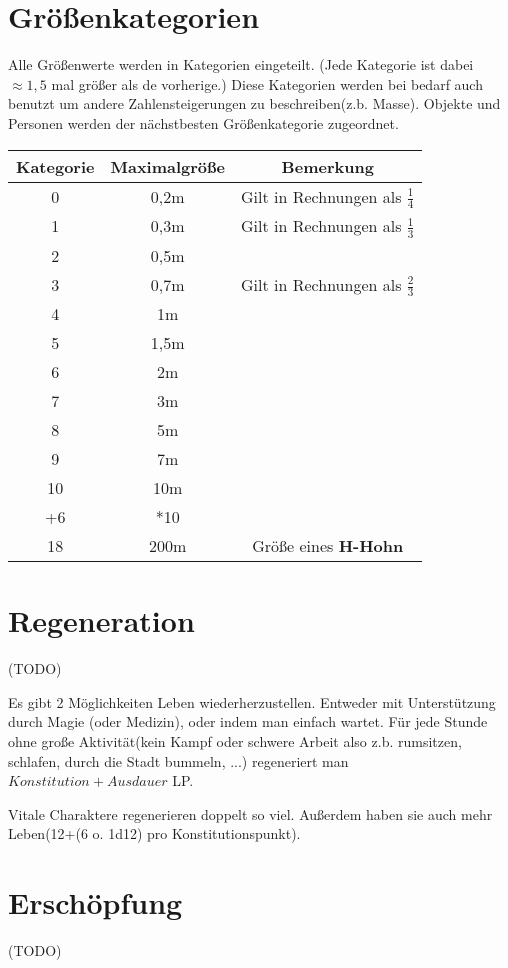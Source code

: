 \section{Größenkategorien}
Alle Größenwerte werden in Kategorien eingeteilt. (Jede Kategorie ist dabei $\approx1,5$ mal größer als de vorherige.) Diese Kategorien werden bei bedarf auch benutzt um andere Zahlensteigerungen zu beschreiben(z.b. Masse). Objekte und Personen werden der nächstbesten Größenkategorie zugeordnet.
\begin{tabular}{|c|c|c|}
\hline 
Kategorie & Maximalgröße & Bemerkung \\ 
\hline 
0 & 0,2m & Gilt in Rechnungen als $\frac{1}{4}$ \\ 
\hline 
1 & 0,3m & Gilt in Rechnungen als $\frac{1}{3}$\\ 
\hline 
2 & 0,5m &\\ 
\hline 
3 & 0,7m & Gilt in Rechnungen als $\frac{2}{3}$\\ 
\hline 
4 & 1m &\\ 
\hline 
5 & 1,5m& \\ 
\hline 
6 & 2m& \\ 
\hline 
7 & 3m& \\ 
\hline 
8 & 5m &\\ 
\hline 
9 & 7m& \\ 
\hline 
10 & 10m &\\ 
\hline 
+6 & *10& \\ 
\hline 
18 & 200m & Größe eines \textbf{H-Hohn}\\ 
\hline 
\end{tabular} 

\section{Regeneration}
\label{vital}
(TODO)

Es gibt 2 Möglichkeiten Leben wiederherzustellen. Entweder mit Unterstützung durch Magie (oder Medizin), oder indem man einfach wartet. Für jede Stunde ohne große Aktivität(kein Kampf oder schwere Arbeit also z.b. rumsitzen, schlafen, durch die Stadt bummeln, ...) regeneriert man $Konstitution+Ausdauer$ LP.

Vitale Charaktere regenerieren doppelt so viel. Außerdem haben sie auch mehr Leben(12+(6 o. 1d12) pro Konstitutionspunkt).

\section{Erschöpfung}
(TODO)

